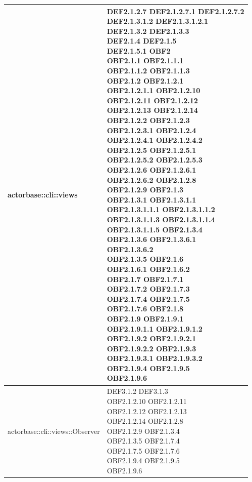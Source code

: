 \documentclass{scalatekids-article}
\begin{document}
\begin{longtable}[H]{|p{9cm}|p{8cm}|}
\hline
actorbase::cli::views & \multiLineCell[t]{DEF2.1.2.7 DEF2.1.2.7.1 DEF2.1.2.7.2\\DEF2.1.3.1.2 DEF2.1.3.1.2.1\\DEF2.1.3.2 DEF2.1.3.3\\DEF2.1.4 DEF2.1.5\\DEF2.1.5.1 OBF2\\OBF2.1.1 OBF2.1.1.1\\OBF2.1.1.2 OBF2.1.1.3\\OBF2.1.2 OBF2.1.2.1\\OBF2.1.2.1.1 OBF2.1.2.10\\OBF2.1.2.11 OBF2.1.2.12\\OBF2.1.2.13 OBF2.1.2.14\\OBF2.1.2.2 OBF2.1.2.3\\OBF2.1.2.3.1 OBF2.1.2.4\\OBF2.1.2.4.1 OBF2.1.2.4.2\\OBF2.1.2.5 OBF2.1.2.5.1\\OBF2.1.2.5.2 OBF2.1.2.5.3\\OBF2.1.2.6 OBF2.1.2.6.1\\OBF2.1.2.6.2 OBF2.1.2.8\\OBF2.1.2.9 OBF2.1.3\\OBF2.1.3.1 OBF2.1.3.1.1\\OBF2.1.3.1.1.1 OBF2.1.3.1.1.2\\OBF2.1.3.1.1.3 OBF2.1.3.1.1.4\\OBF2.1.3.1.1.5 OBF2.1.3.4\\OBF2.1.3.6 OBF2.1.3.6.1\\OBF2.1.3.6.2\\OBF2.1.3.5 OBF2.1.6\\OBF2.1.6.1 OBF2.1.6.2\\OBF2.1.7 OBF2.1.7.1\\OBF2.1.7.2 OBF2.1.7.3\\OBF2.1.7.4 OBF2.1.7.5\\OBF2.1.7.6 OBF2.1.8\\OBF2.1.9 OBF2.1.9.1\\OBF2.1.9.1.1 OBF2.1.9.1.2\\OBF2.1.9.2 OBF2.1.9.2.1\\OBF2.1.9.2.2 OBF2.1.9.3\\OBF2.1.9.3.1 OBF2.1.9.3.2\\OBF2.1.9.4 OBF2.1.9.5\\OBF2.1.9.6\\}\\
\hline
actorbase::cli::views::Observer & \multiLineCell[t]{DEF3.1.2 DEF3.1.3\\OBF2.1.2.10 OBF2.1.2.11\\OBF2.1.2.12 OBF2.1.2.13\\OBF2.1.2.14 OBF2.1.2.8\\OBF2.1.2.9 OBF2.1.3.4\\OBF2.1.3.5 OBF2.1.7.4\\OBF2.1.7.5 OBF2.1.7.6\\OBF2.1.9.4 OBF2.1.9.5\\OBF2.1.9.6\\}\\

\end{longtable}
\end{document}

